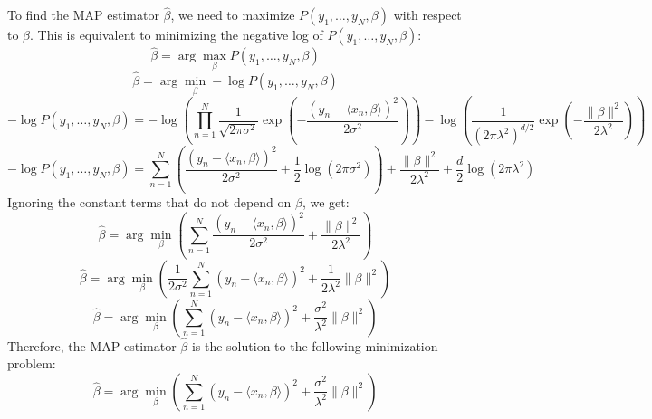 \documentclass[a3paper,12pt]{extarticle} %
\begin{document}
\begin{enumerate}
\begin{enumerate}
\begin{enumerate}
            To find the MAP estimator \( \hat{\beta} \), we need to maximize \( P(y_1, \ldots, y_N, \beta) \) with respect to \( \beta \). This is equivalent to minimizing the negative log of \( P(y_1, \ldots, y_N, \beta) \):
            \[
                \hat{\beta} = \arg \max_{\beta} P(y_1, \ldots, y_N, \beta)
            \]
            \[
                \hat{\beta} = \arg \min_{\beta} -\log P(y_1, \ldots, y_N, \beta)
            \]
            \[
                -\log P(y_1, \ldots, y_N, \beta) = -\log \left( \prod_{n=1}^N \frac{1}{\sqrt{2 \pi \sigma^2}} \exp \left( -\frac{(y_n - \langle x_n, \beta \rangle)^2}{2 \sigma^2} \right) \right) - \log \left( \frac{1}{(2 \pi \lambda^2)^{d/2}} \exp \left( -\frac{\|\beta\|^2}{2 \lambda^2} \right) \right)
            \]
            \[
                -\log P(y_1, \ldots, y_N, \beta) = \sum_{n=1}^N \left( \frac{(y_n - \langle x_n, \beta \rangle)^2}{2 \sigma^2} + \frac{1}{2} \log (2 \pi \sigma^2) \right) + \frac{\|\beta\|^2}{2 \lambda^2} + \frac{d}{2} \log (2 \pi \lambda^2)
            \]
            Ignoring the constant terms that do not depend on \( \beta \), we get:
            \[
                \hat{\beta} = \arg \min_{\beta} \left( \sum_{n=1}^N \frac{(y_n - \langle x_n, \beta \rangle)^2}{2 \sigma^2} + \frac{\|\beta\|^2}{2 \lambda^2} \right)
            \]
            \[
                \hat{\beta} = \arg \min_{\beta} \left( \frac{1}{2 \sigma^2} \sum_{n=1}^N (y_n - \langle x_n, \beta \rangle)^2 + \frac{1}{2 \lambda^2} \|\beta\|^2 \right)
            \]
            \[
                \hat{\beta} = \arg \min_{\beta} \left( \sum_{n=1}^N (y_n - \langle x_n, \beta \rangle)^2 + \frac{\sigma^2}{\lambda^2} \|\beta\|^2 \right)
            \]
            Therefore, the MAP estimator \( \hat{\beta} \) is the solution to the following minimization problem:
            \[
                \hat{\beta} = \arg \min_{\beta} \left( \sum_{n=1}^N (y_n - \langle x_n, \beta \rangle)^2 + \frac{\sigma^2}{\lambda^2} \|\beta\|^2 \right)
            \]
        \end{enumerate}

    \end{enumerate}
\end{enumerate}

\newpage
\end{document}
